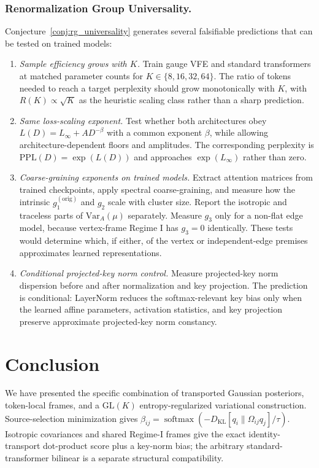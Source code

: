 \documentclass[twoside,11pt]{article}
\newcommand{\softmax}{\operatorname{softmax}}
\newcommand{\KL}{\operatorname{KL}}
\begin{document}
\subsubsection{Renormalization Group Universality.}

Conjecture~\ref{conj:rg_universality} generates several falsifiable predictions that can be tested on trained models:
\begin{enumerate}
\item \emph{Sample efficiency grows with $K$.} Train gauge VFE and standard transformers at matched parameter counts for $K \in \{8, 16, 32, 64\}$. The ratio of tokens needed to reach a target perplexity should grow monotonically with $K$, with $R(K) \propto \sqrt{K}$ as the heuristic scaling class rather than a sharp prediction.
\item \emph{Same loss-scaling exponent.} Test whether both architectures obey $L(D)=L_\infty+AD^{-\beta}$ with a common exponent $\beta$, while allowing architecture-dependent floors and amplitudes. The corresponding perplexity is $\mathrm{PPL}(D)=\exp(L(D))$ and approaches $\exp(L_\infty)$ rather than zero.
\item \emph{Coarse-graining exponents on trained models.} Extract attention matrices from trained checkpoints, apply spectral coarse-graining, and measure how the intrinsic $g_1^{(\mathrm{orig})}$ and $g_2$ scale with cluster size. Report the isotropic and traceless parts of $\mathrm{Var}_A(\mu)$ separately. Measure $g_3$ only for a non-flat edge model, because vertex-frame Regime I has $g_3=0$ identically. These tests would determine which, if either, of the vertex or independent-edge premises approximates learned representations.
\item \emph{Conditional projected-key norm control.} Measure projected-key norm dispersion before and after normalization and key projection. The prediction is conditional: LayerNorm reduces the softmax-relevant key bias only when the learned affine parameters, activation statistics, and key projection preserve approximate projected-key norm constancy.
\end{enumerate}

\section{Conclusion}

We have presented the specific combination of transported Gaussian posteriors, token-local frames, and a $\mathrm{GL}(K)$ entropy-regularized variational construction. Source-selection minimization gives $\beta_{ij}=\softmax(-D_{\KL}[q_i\|\Omega_{ij}q_j]/\tau)$. Isotropic covariances and shared Regime-I frames give the exact identity-transport dot-product score plus a key-norm bias; the arbitrary standard-transformer bilinear is a separate structural compatibility.
\end{document}

